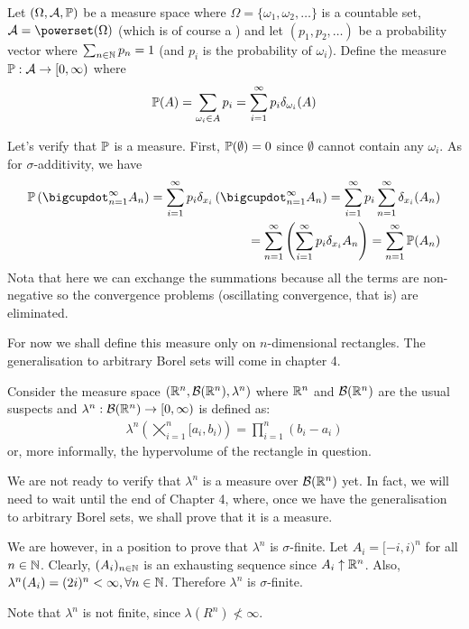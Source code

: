 \begin{eg}
	Let $(\Omega, \mathcal{A}, \mathbb{P})$ be a measure space where $\Omega = \{\omega_1, \omega_2, \dots \}$ is a countable set, $\sa = \powerset(\Omega)$ (which is of course a \siga) and let $(p_1, p_2, \dots)$ be a probability vector where $\sum_{n\in \mathbb{N}} p_n = 1$ (and $p_i$ is the probability of $\omega_i$). Define the measure $\mathbb{P} : \mathcal{A} \to [0, \infty)$ where
	\begin{align*}
		\mathbb{P}(A) = \sum_{\omega_i \in A} p_i = \sum_{i=1}^\infty p_i \delta_{\omega_i}(A)
	\end{align*}
	
	Let's verify that $\mathbb{P}$ is a measure. First, $\mathbb{P}(\emptyset) = 0$ since $\emptyset$ cannot contain any $\omega_i$. As for $\sigma$-additivity, we have
	\begin{align*}
		\Pro\left(\bigcupdot_{n = 1}^\infty A_n\right) = \sum_{i=1}^\infty p_i \delta_{x_i}\left(\bigcupdot_{n = 1}^\infty A_n\right) = \sum_{i = 1}^\infty p_i \sum_{n = 1}^\infty \delta_{x_i}(A_n) \\
		= \sum_{n = 1}^\infty \left(\sum_{i = 1}^\infty p_i\delta_{x_i} A_n\right) = \sum_{n = 1}^\infty \Pro(A_n)
	\end{align*}
	Nota that here we can exchange the summations because all the terms are non-negative so the convergence problems (oscillating convergence, that is) are eliminated.
\end{eg}

\begin{eg}
	\label{eg:lebesgue-measure}
	For now we shall define this measure only on $n$-dimensional rectangles. The generalisation to arbitrary Borel sets will come in chapter 4.
	
	Consider the measure space $(\mathbb{R}^n, \mathcal{B}(\mathbb{R}^n), \lambda^n)$ where $\mathbb{R}^n$ and $\mathcal{B}(\mathbb{R}^n)$ are the usual suspects and $\lambda^n : \mathcal{B}(\mathbb{R}^n) \to [0, \infty)$ is defined as:
	\begin{align}
		\lambda^n\left(\bigtimes_{i = 1}^n [a_i, b_i)\right) = \prod_{i=1}^{n} (b_i - a_i)
	\end{align}
	or, more informally, the hypervolume of the rectangle in question.
	
	We are not ready to verify that $\lambda^n$ is a measure over $\mathcal{B}(\mathbb{R}^n)$ yet. In fact, we will need to wait until the end of Chapter 4, where, once we have the generalisation to arbitrary Borel sets, we shall prove that it is a measure.
	
	We are however, in a position to prove that $\lambda^n$ is $\sigma$-finite. Let $A_i = [-i, i)^n$ for all $n \in \mathbb{N}$. Clearly, $(A_i)_{n \in \mathbb{N}}$ is an exhausting sequence since $A_i \uparrow \mathbb{R}^n$. Also, $\lambda^n(A_i) = (2i)^n < \infty, \forall n \in \mathbb{N}$. Therefore $\lambda^n$ is $\sigma$-finite.
	
	Note that $\lambda^n$ is not finite, since $\lambda(R^n) \not< \infty$.
\end{eg}